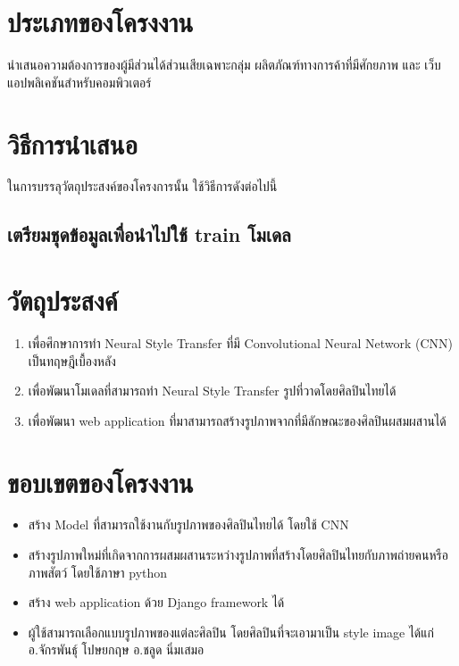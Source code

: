 \documentclass[12pt,oneside,openright,a4paper]{cpe-thai-project}
\begin{document}
\section{ประเภทของโครงงาน}
\par\setlength{\parindent}{5ex}นําเสนอความต้องการของผู้มีส่วนได้ส่วนเสียเฉพาะกลุ่ม ผลิตภัณฑ์ทางการค้าที่มีศักยภาพ และ เว็บแอปพลิเคชันสำหรับคอมพิวเตอร์

\section{วิธีการนำเสนอ}
\par\setlength{\parindent}{5ex}ในการบรรลุวัตถุประสงค์ของโครงการนั้น ใช้วิธีการดังต่อไปนี้
\subsection{เตรียมชุดข้อมูลเพื่อนำไปใช้ train โมเดล}


\section{วัตถุประสงค์}
\begin{enumerate}
  \item	เพื่อศึกษาการทำ Neural Style Transfer ที่มี Convolutional Neural Network (CNN) เป็นทฤษฎีเบื้องหลัง
  \item เพื่อพัฒนาโมเดลที่สามารถทำ Neural Style Transfer รูปที่วาดโดยศิลปินไทยได้
  \item เพื่อพัฒนา web application ที่มาสามารถสร้างรูปภาพจากที่มีลักษณะของศิลปินผสมผสานได้
\end{enumerate}



\section{ขอบเขตของโครงงาน}

\begin{itemize}
\item  สร้าง Model ที่สามารถใช้งานกับรูปภาพของศิลปินไทยได้ โดยใช้ CNN 
\item  สร้างรูปภาพใหม่ที่เกิดจากการผสมผสานระหว่างรูปภาพที่สร้างโดยศิลปินไทยกับภาพถ่ายคนหรือภาพสัตว์ โดยใช้ภาษา python
\item  สร้าง web application ด้วย Django framework ได้ 
\item ผู้ใช้สามารถเลือกแบบรูปภาพของแต่ละศิลปิน โดยศิลปินที่จะเอามาเป็น style image ได้แก่ 
\subitem อ.จักรพันธุ์ โปษยกฤษ
\subitem อ.ชลูด นิ่มเสมอ
\end{itemize}
\end{document}
